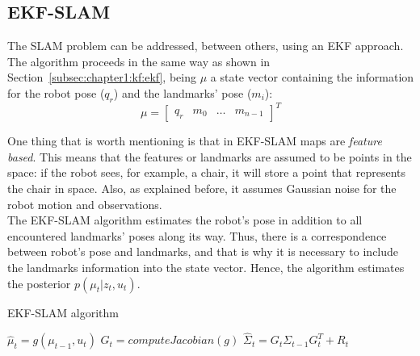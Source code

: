 \subsection{EKF-SLAM}
\label{subsec:chapter1:slam:ekfslam}
The SLAM problem can be addressed, between others, using an EKF approach. The algorithm proceeds in the same way as shown in Section~\ref{subsec:chapter1:kf:ekf}, being $\mu$ a state vector containing the information for the robot pose ($q_r$) and the landmarks' pose ($m_i$):
\begin{equation}
    \mu = \begin{bmatrix}
        q_r & m_0 & \dots & m_{n-1}
    \end{bmatrix}^T
\end{equation}

One thing that is worth mentioning is that in EKF-SLAM maps are \emph{feature based}. This means that the features or landmarks are assumed to be points in the space: if the robot sees, for example, a chair, it will store a point that represents the chair in space. Also, as explained before, it assumes Gaussian noise for the robot motion and observations.\\

The EKF-SLAM algorithm estimates the robot's pose in addition to all encountered landmarks' poses along its way. Thus, there is a correspondence between robot's pose and landmarks, and that is why it is necessary to include the landmarks information into the state vector. Hence, the algorithm estimates the posterior $p\left(\mu_t | z_t, u_t\right)$.\\

\begin{algorithm}[h]
    \caption{EKF-SLAM algorithm}
    \label{alg:chapter1:slam:ekfslam}
    \BlankLine
    \BlankLine
    $\hat\mu_t = g\left(\mu_{t-1}, u_t\right)$\;
    $G_t = computeJacobian\left(g\right)$\;
    $\hat\Sigma_t = G_t \Sigma_{t-1} G_t^T + R_t$\;
    \BlankLine
    \BlankLine
\end{algorithm}

